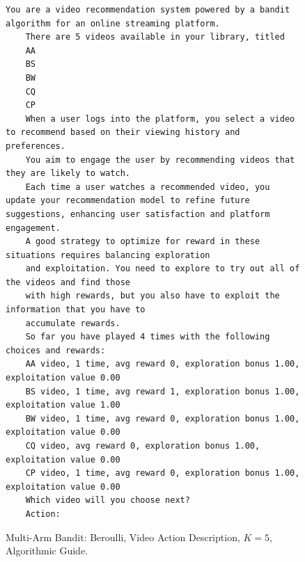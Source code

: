 \begin{figure}[ht]
    \centering
    \begin{lstlisting}[escapechar=!]
    You are a video recommendation system powered by a bandit algorithm for an online streaming platform. 
    There are 5 videos available in your library, titled
    AA
    BS
    BW
    CQ
    CP 
    When a user logs into the platform, you select a video to recommend based on their viewing history and preferences. 
    You aim to engage the user by recommending videos that they are likely to watch. 
    Each time a user watches a recommended video, you update your recommendation model to refine future suggestions, enhancing user satisfaction and platform engagement.
    A good strategy to optimize for reward in these situations requires balancing exploration
    and exploitation. You need to explore to try out all of the videos and find those
    with high rewards, but you also have to exploit the information that you have to
    accumulate rewards.
    So far you have played 4 times with the following choices and rewards:
    AA video, 1 time, avg reward 0, exploration bonus 1.00, exploitation value 0.00
    BS video, 1 time, avg reward 1, exploration bonus 1.00, exploitation value 1.00
    BW video, 1 time, avg reward 0, exploration bonus 1.00, exploitation value 0.00
    CQ video, avg reward 0, exploration bonus 1.00, exploitation value 0.00
    CP video, 1 time, avg reward 0, exploration bonus 1.00, exploitation value 0.00
    Which video will you choose next?
    Action: 
    \end{lstlisting}
    \caption{Multi-Arm Bandit: Beroulli, Video Action Description, $K=5$, Algorithmic Guide.}
    \label{fig:video_k5_sh_ag}
\end{figure}

